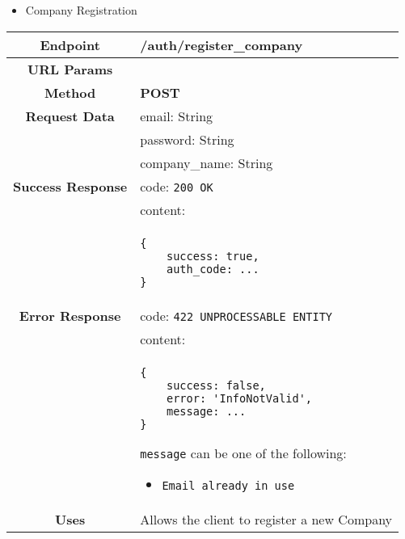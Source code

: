     \begin{itemize}
        \item Company Registration
    \end{itemize}
    \begin{adjustwidth}{1cm}{}
        \begin{longtable}{|c|l|}
            \hline
            \textbf{Endpoint} & /auth/register\_company \\
            \hline
            \textbf{URL Params} &  \\
            \hline
            \textbf{Method} & \textbf{POST} \\
            \hline
            \textbf{Request Data} & email: String \\
            &                 password: String \\
            &                 company\_name: String \\

            \hline
            \textbf{Success Response} & code: \texttt{200 OK} \\
            &                           content: \\
            & \begin{minipage}[t]{0.5\textwidth}
                \begin{adjustwidth}{1.5cm}{}
                \begin{verbatim}
{
    success: true, 
    auth_code: ...
}
                \end{verbatim}
                \end{adjustwidth}
              \end{minipage} \\
              \hline
            \textbf{Error Response} & code: \texttt{422 UNPROCESSABLE ENTITY} \\
            &                         content: \\
            & \begin{minipage}[t]{0.7\textwidth}
                \begin{adjustwidth}{1.5cm}{}
                \begin{verbatim}
{
    success: false, 
    error: 'InfoNotValid',
    message: ...
}
                \end{verbatim}
                \end{adjustwidth}
                \texttt{message} can be one of the following: 
                \begin{itemize}
                    \item \texttt{Email already in use}
                \end{itemize}
              \end{minipage} \\
              \hline
            \textbf{Uses} & Allows the client to register a new Company \\
            \hline
        \end{longtable}
    \end{adjustwidth}

